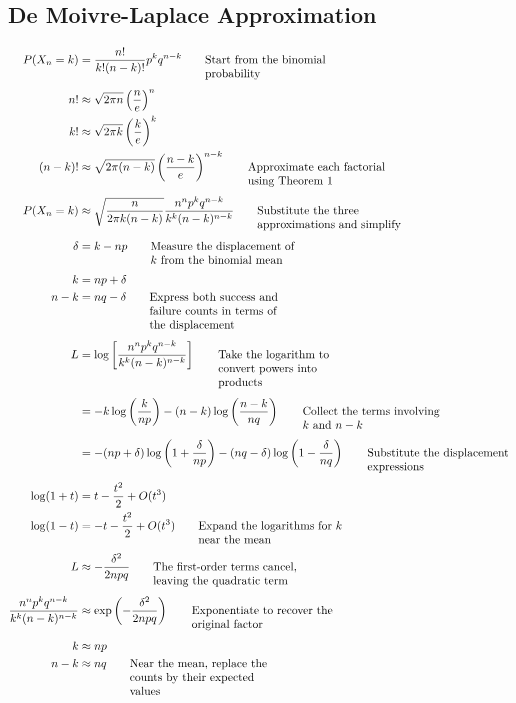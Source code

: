\documentclass{article}
\newcommand{\justwidth}{0.36\textwidth}
\newcommand{\just}[1]{\parbox[t]{\justwidth}{\raggedright #1}}
\begin{document}
\subsection{De Moivre-Laplace Approximation}
\begin{align*}
P(X_n=k)
&=
\frac{n!}{k!(n-k)!}p^kq^{n-k}
\tag*{\just{Start from the binomial probability}}
\\[0.45em]
n!
&\approx
\sqrt{2\pi n}
\left(\frac{n}{e}\right)^n
\\
k!
&\approx
\sqrt{2\pi k}
\left(\frac{k}{e}\right)^k
\\
(n-k)!
&\approx
\sqrt{2\pi(n-k)}
\left(\frac{n-k}{e}\right)^{n-k}
\tag*{\just{Approximate each factorial using Theorem 1}}
\\[0.45em]
P(X_n=k)
&\approx
\sqrt{\frac{n}{2\pi k(n-k)}}
\frac{n^np^kq^{n-k}}
{k^k(n-k)^{n-k}}
\tag*{\just{Substitute the three approximations and simplify}}
\\[0.45em]
\delta
&=
k-np
\tag*{\just{Measure the displacement of $k$ from the binomial mean}}
\\[0.45em]
k
&=
np+\delta
\\
n-k
&=
nq-\delta
\tag*{\just{Express both success and failure counts in terms of the displacement}}
\\[0.45em]
L
&=
\log\left[
\frac{n^np^kq^{n-k}}
{k^k(n-k)^{n-k}}
\right]
\tag*{\just{Take the logarithm to convert powers into products}}
\\[0.45em]
&=
-k\log\left(\frac{k}{np}\right)
-(n-k)\log\left(\frac{n-k}{nq}\right)
\tag*{\just{Collect the terms involving $k$ and $n-k$}}
\\[0.45em]
&=
-(np+\delta)
\log\left(1+\frac{\delta}{np}\right)
-(nq-\delta)
\log\left(1-\frac{\delta}{nq}\right)
\tag*{\just{Substitute the displacement expressions}}
\\[0.45em]
\log(1+t)
&=
t-\frac{t^2}{2}+O(t^3)
\\
\log(1-t)
&=
-t-\frac{t^2}{2}+O(t^3)
\tag*{\just{Expand the logarithms for $k$ near the mean}}
\\[0.45em]
L
&\approx
-\frac{\delta^2}{2npq}
\tag*{\just{The first-order terms cancel, leaving the quadratic term}}
\\[0.45em]
\frac{n^np^kq^{n-k}}
{k^k(n-k)^{n-k}}
&\approx
\exp\left(
-\frac{\delta^2}{2npq}
\right)
\tag*{\just{Exponentiate to recover the original factor}}
\\[0.45em]
k
&\approx
np
\\
n-k
&\approx
nq
\tag*{\just{Near the mean, replace the counts by their expected values}}

\end{align*}
\end{document}
